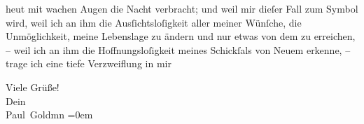                   heut mit wachen Augen die Nacht verbracht; und weil
               mir dieſer Fall zum Symbol wird, weil ich an ihm die Ausſichtsloſigkeit aller meiner
               Wünſche, die Unmöglichkeit, meine Lebenslage zu ändern und nur etwas von dem \label{K_L02932-3v}\label{K_L02932-3} zu erreichen, – weil ich an ihm die
               Hoffnungsloſigkeit meines Schickſals von Neuem erkenne, – trage ich eine tiefe
               Verzweiflung in mir{\dotsfive}\pend
           
\pstart
           Viele Grüße! {\\[\baselineskip]}Dein {\\[\baselineskip]}\spacefill\mbox{Paul Goldmn}\pend
           \leftskip=0em{}\endnumbering{}  \newcommand{\dateiname}{L02932}\newcommand{\titel}{Paul Goldmann an Arthur Schnitzler, 20. 9. [1900]}\newcommand{\editorInnen}{Martin Anton Müller und Laura Untner}
